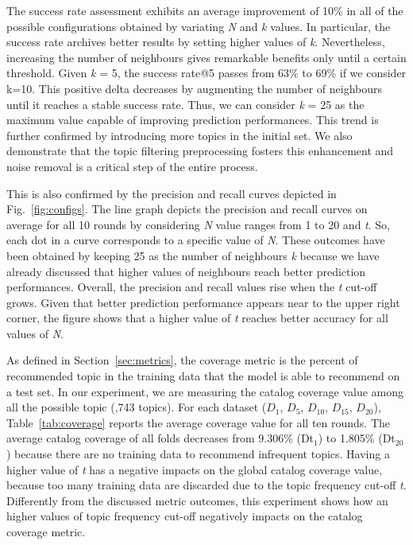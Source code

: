 The success rate assessment exhibits an average improvement of 10\% in all of the possible configurations obtained by variating \emph{N} and \emph{k} values. In particular, the success rate archives better results by setting higher values of \emph{k}. Nevertheless, increasing the number of neighbours gives remarkable benefits only until a certain threshold. Given \emph{k} = 5, the success rate@5 passes from 63\% to 69\% if we consider k=10. This positive delta decreases by augmenting the number of neighbours until it reaches a stable success rate. Thus, we can consider \emph{k} = 25 as the maximum value capable of improving prediction performances. This trend is further confirmed by introducing more topics in the initial set. We also demonstrate that the topic filtering preprocessing fosters this enhancement and noise removal is a critical step of the entire process.

This is also confirmed by the precision and recall curves depicted in Fig.~\ref{fig:configs}. 
The line graph depicts the precision and recall curves on average for all 10 rounds by considering \emph{N} value ranges from 1 to 20 and \emph{t}. So, each dot in a curve corresponds to a specific value of \emph{N}. 
These outcomes have been obtained by keeping 25 as the number of neighbours \emph{k} because we have already discussed that higher values of neighbours reach better prediction performances. Overall, the precision and recall values rise when the \emph{t} cut-off grows. Given that better prediction performance appears near to the upper right corner, the figure shows that a higher value of \emph{t} reaches better accuracy for all values of \emph{N}.


As defined in Section~\ref{sec:metrics}, the coverage metric is the percent of recommended topic in the training data that the model is able to recommend on a test set. In our experiment, we are measuring the catalog coverage value among all the possible topic (,743 topics). For each dataset (\ie $D_{1}$, $D_{5}$, $D_{10}$, $D_{15}$, $D_{20}$),  Table~\ref{tab:coverage} reports the average coverage value for all ten rounds. 
The average catalog coverage of all folds decreases from 9.306\% (Dt$_1$) to 1.805\% (Dt$_{20}$) because there are no training data to recommend infrequent topics. 
Having a higher value of \emph{t} has a negative impacts on the global catalog coverage value, because too many training data are discarded due to the topic frequency cut-off \emph{t}. Differently from the discussed metric outcomes, this experiment shows how an higher values of topic frequency cut-off negatively impacts on the catalog coverage metric.

